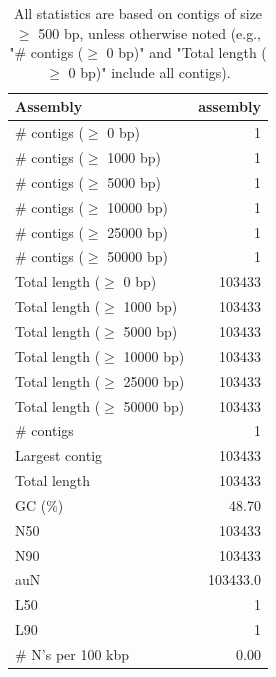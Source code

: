 \documentclass[12pt,a4paper]{article}
\begin{document}
\begin{table}[ht]
\begin{center}
\caption{All statistics are based on contigs of size $\geq$ 500 bp, unless otherwise noted (e.g., "\# contigs ($\geq$ 0 bp)" and "Total length ($\geq$ 0 bp)" include all contigs).}
\begin{tabular}{|l*{1}{|r}|}
\hline
Assembly & assembly \\ \hline
\# contigs ($\geq$ 0 bp) & 1 \\ \hline
\# contigs ($\geq$ 1000 bp) & 1 \\ \hline
\# contigs ($\geq$ 5000 bp) & 1 \\ \hline
\# contigs ($\geq$ 10000 bp) & 1 \\ \hline
\# contigs ($\geq$ 25000 bp) & 1 \\ \hline
\# contigs ($\geq$ 50000 bp) & 1 \\ \hline
Total length ($\geq$ 0 bp) & 103433 \\ \hline
Total length ($\geq$ 1000 bp) & 103433 \\ \hline
Total length ($\geq$ 5000 bp) & 103433 \\ \hline
Total length ($\geq$ 10000 bp) & 103433 \\ \hline
Total length ($\geq$ 25000 bp) & 103433 \\ \hline
Total length ($\geq$ 50000 bp) & 103433 \\ \hline
\# contigs & 1 \\ \hline
Largest contig & 103433 \\ \hline
Total length & 103433 \\ \hline
GC (\%) & 48.70 \\ \hline
N50 & 103433 \\ \hline
N90 & 103433 \\ \hline
auN & 103433.0 \\ \hline
L50 & 1 \\ \hline
L90 & 1 \\ \hline
\# N's per 100 kbp & 0.00 \\ \hline
\end{tabular}
\end{center}
\end{table}
\end{document}

